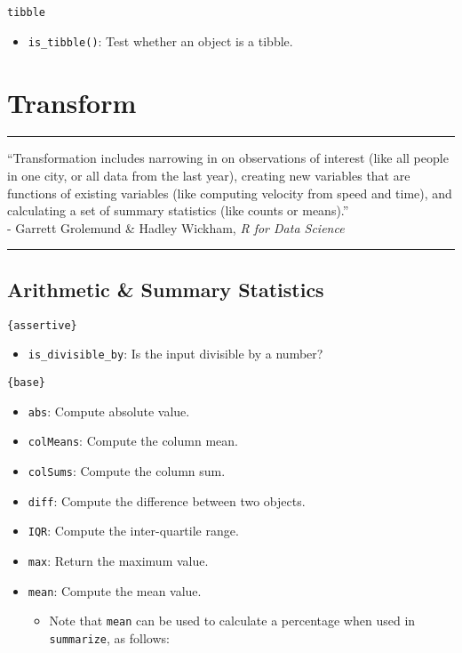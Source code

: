 \documentclass[]{book}
\providecommand{\tightlist}{%
  \setlength{\itemsep}{0pt}\setlength{\parskip}{0pt}}
\begin{document}
\texttt{tibble}

\begin{itemize}
\tightlist
\item
  \texttt{is\_tibble()}: Test whether an object is a tibble.
\end{itemize}

\hypertarget{transform}{%
\chapter{Transform}\label{transform}}

\begin{center}\rule{0.5\linewidth}{\linethickness}\end{center}

``Transformation includes narrowing in on observations of interest (like all people in one city, or all data from the last year), creating new variables that are functions of existing variables (like computing velocity from speed and time), and calculating a set of summary statistics (like counts or means).''\\
- Garrett Grolemund \& Hadley Wickham, \emph{R for Data Science}

\begin{center}\rule{0.5\linewidth}{\linethickness}\end{center}

\hypertarget{arithmetic-summary-statistics}{%
\section{Arithmetic \& Summary Statistics}\label{arithmetic-summary-statistics}}

\texttt{\{assertive\}}

\begin{itemize}
\tightlist
\item
  \texttt{is\_divisible\_by}: Is the input divisible by a number?
\end{itemize}

\texttt{\{base\}}

\begin{itemize}
\tightlist
\item
  \texttt{abs}: Compute absolute value.
\item
  \texttt{colMeans}: Compute the column mean.
\item
  \texttt{colSums}: Compute the column sum.
\item
  \texttt{diff}: Compute the difference between two objects.
\item
  \texttt{IQR}: Compute the inter-quartile range.
\item
  \texttt{max}: Return the maximum value.
\item
  \texttt{mean}: Compute the mean value.

  \begin{itemize}
  \tightlist
  \item
    Note that \texttt{mean} can be used to calculate a percentage when used in \texttt{summarize}, as follows:
  \end{itemize}
\end{itemize}
\end{document}
